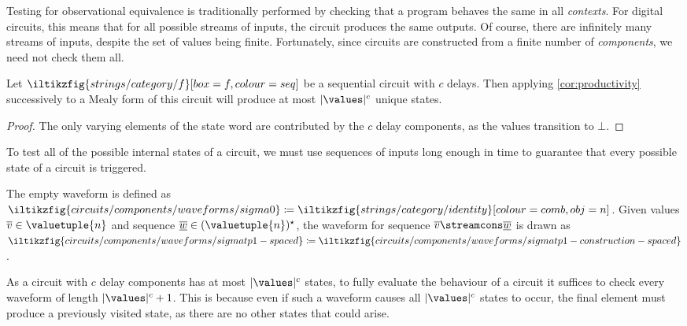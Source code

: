 \documentclass{lmcs}
\begin{document}
Testing for observational equivalence is traditionally performed by checking
that a program behaves the same in all \emph{contexts}.
For digital circuits, this means that for all possible streams of inputs, the
circuit produces the same outputs.
Of course, there are infinitely many streams of inputs, despite the set of
values being finite.
Fortunately, since circuits are constructed from a finite number of
\emph{components}, we need not check them all.

\begin{lem}\label{lem:number-of-states}
    Let \(
    \iltikzfig{strings/category/f}[box=f,colour=seq]
    \) be a sequential circuit with \(c\) delays.
    Then applying \autoref{cor:productivity} successively to a Mealy form of
    this circuit will produce at most \(|\values|^c\) unique states.
\end{lem}
\begin{proof}
    The only varying elements of the state word are contributed by
    the \(c\) delay components, as the values transition to \(\bot\).
\end{proof}

To test all of the possible internal states of a circuit, we must use
sequences of inputs long enough in time to guarantee that every possible state
of a circuit is triggered.

\begin{nota}[Waveform]\label{def:waveform}
    The empty waveform is defined as \(
    \iltikzfig{circuits/components/waveforms/sigma0}
    \coloneqq
    \iltikzfig{strings/category/identity}[colour=comb,obj=n]
    \).
    Given values \(\overline{v} \in \valuetuple{n}\) and sequence \(
    \overline{\underline{w}} \in (\valuetuple{n})^\star
    \), the waveform for sequence \(
    \overline{v} \streamcons \overline{\underline{w}}
    \) is drawn as \(
    \iltikzfig{circuits/components/waveforms/sigmatp1-spaced}
    \coloneqq
    \iltikzfig{circuits/components/waveforms/sigmatp1-construction-spaced}
    \).
\end{nota}

As a circuit with \(c\) delay components has at most \(|\values|^c\) states,
to fully evaluate the behaviour of a circuit it suffices to check every
waveform of length \(|\values|^c + 1\).
This is because even if such a waveform causes all \(|\values|^c\) states to
occur, the final element must produce a previously visited state, as there are
no other states that could arise.
\end{document}
